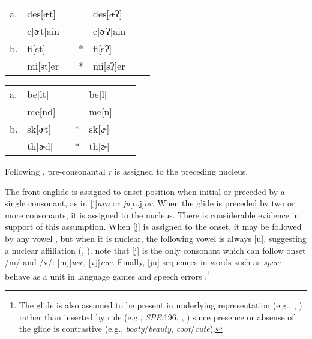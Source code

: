 \begin{example}
\label{tglottalization}
\begin{tabular}{l l l l@{} l l l}
a. & {des}[ɚt]    & \alt{} &   & {des}[ɚʔ]    \\
   & {c}[ɚt]{ain} & \alt{} &   & {c}[ɚʔ]{ain} \\
b. & {fi}[st]     & \alt{} & * & {fi}[sʔ]     \\
   & {mi}[st]{er} & \alt{} & * & {mi}[sʔ]{er} \\
\end{tabular}
\end{example}

\begin{example}
\label{tddeletion}
\begin{tabular}{l l l l@{} l l l}
a. & {be}[lt] & \alt{} &   & {be}[l] \\
   & {me}[nd] & \alt{} &   & {me}[n] \\
b. & {sk}[ɚt] & \alt{} & * & {sk}[ɚ] \\
   & {th}[ɚd] & \alt{} & * & {th}[ɚ] \\
\end{tabular}
\end{example}

\noindent
Following \citet{Pierrehumbert1994}, pre-consonantal \emph{r} is assigned to the preceding nucleus.

The front onglide is assigned to onset position when initial or preceded by a single consonant, as in [j]\emph{arn} or \emph{ju}[n.j]\emph{or}. When the glide is preceded by two or more consonants, it is assigned to the nucleus. There is considerable evidence in support of this assumption. When [j] is assigned to the onset, it may be followed by any vowel \citep[276]{Borowsky1986}, but when it is nuclear, the following vowel is always [u], suggesting a nuclear affiliation (\citealp[61f.]{Harris1994}, \citealp[232]{Hayes1980}). \citet[42]{Clements1983} note that [j] is the only consonant which can follow onset /m/ and /v/: [mj]\emph{use}, [vj]\emph{iew}. Finally, [ju] sequences in words such as \emph{spew} behave as a unit in language games \citep{Davis1995,Nevins2003} and speech errors \citep[130]{Shattuck-Hufnagel1986}.\footnote{The glide is also assumed to be present in underlying representation (e.g., \citealp{Anderson1988b}, \citealp[278]{Borowsky1986}) rather than inserted by rule (e.g., \emph{SPE}:196, \citealp[][89]{Halle1985a}, \citealp[][217]{McMahon1990}) since presence or absense of the glide is contrastive (e.g., \emph{booty}/\emph{beauty}, \emph{coot}/\emph{cute}).}

